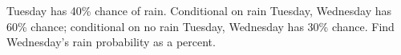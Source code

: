 Tuesday has 40\% chance of rain. Conditional on rain Tuesday, Wednesday has 60\% chance; conditional on no rain Tuesday, Wednesday has 30\% chance. Find Wednesday's rain probability as a percent.

